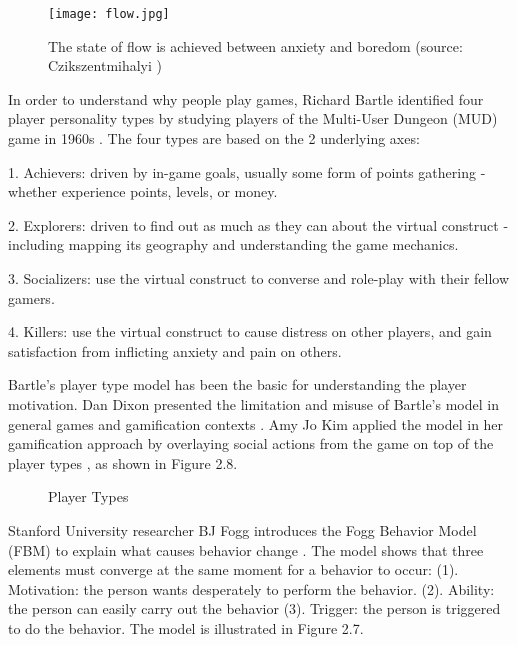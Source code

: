 \begin{figure}[htbp]
	\centering
		\texttt{[image: flow.jpg]}
		\caption{The state of flow is achieved between anxiety and boredom (source: Czikszentmihalyi \cite{csikszentmihalyi1991flow})}
		\label{fig:state_of_flow}
\end{figure}

In order to understand why people play games, Richard Bartle identified four player personality types by studying players of the Multi-User Dungeon (MUD) game in 1960s \cite {bartle1996hearts}. The four types are based on the 2 underlying axes:

1. Achievers: driven by in-game goals, usually some form of points gathering - whether experience points, levels, or money.

2. Explorers:  driven to find out as much as they can about the virtual construct - including mapping its geography and understanding the game mechanics.

3. Socializers: use the virtual construct to converse and role-play with their fellow gamers.

4. Killers: use the virtual construct to cause distress on other players, and gain satisfaction from inflicting anxiety and pain on others.

Bartle's player type model has been the basic for understanding the player motivation. Dan Dixon presented the limitation and misuse of Bartle's model in general games and gamification contexts \cite{DixonPlayerType}. Amy Jo Kim applied the model in her gamification approach by overlaying social actions from the game on top of the player types \cite {Kim2010}, as shown in Figure 2.8.

\begin{figure}[htbp]
	\centering
		\caption{Player Types}
		\label{fig:play-types}
\end{figure}

Stanford University researcher BJ Fogg introduces the Fogg Behavior Model (FBM) to explain what causes behavior change \cite {fogg_2003}. The model shows that three elements must converge at the same moment for a behavior to occur: (1). Motivation: the person wants desperately to perform the behavior. (2). Ability: the person can easily carry out the behavior (3). Trigger: the person is triggered to do the behavior. The model is illustrated in Figure 2.7.

